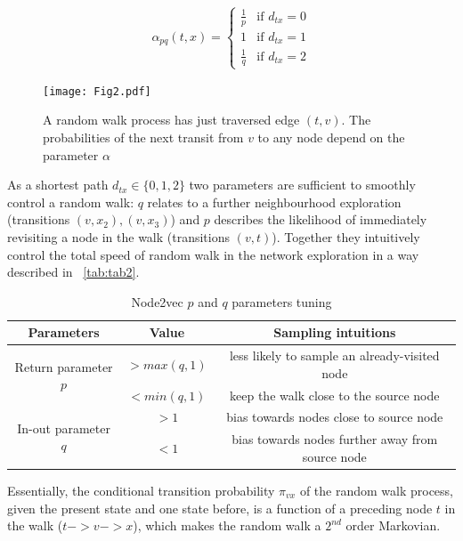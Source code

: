 \begin{equation}
  \alpha_{pq}(t,x) = 
    \begin{cases}
      \frac{1}{p} & \text{if $d_{tx}=0$} \\
      1 & \text{if $d_{tx}=1$} \\
      \frac{1}{q} & \text{if $d_{tx}=2$}
    \end{cases}
    \label{eq:equat2}
\end{equation}
\begin{figure}[!hp]
    \vspace{0pt}
    \centering
    \texttt{[image: Fig2.pdf]}
    \caption{A random walk process has just traversed edge $(t,v)$. The probabilities of the next transit from $v$ to any node depend on the parameter $\alpha$}
    \label{fig:Fig2}
\end{figure}
As a shortest path $d_{tx} \in \{ 0, 1, 2 \} $ two parameters are sufficient to smoothly control a random walk: $q$ relates to a further neighbourhood exploration (transitions $(v, x_2), (v, x_3)$) and $p$ describes the likelihood of immediately revisiting a node in the walk (transitions $(v, t)$). Together they intuitively control the total speed of random walk in the network exploration in a way described in ~\autoref{tab:tab2}.
\begin{table}[!hp]
\begin{center}
\begin{tabular}{|c|c|c|}
    \hline
    Parameters & Value & Sampling intuitions \\
    \hline
    \multirow{2}{*}{Return parameter $p$} & $> max(q,1)$ & less likely to sample an already-visited node \\\cline{2-3}
    & $< min(q, 1)$ & keep the walk close to the source node \\
    \hline
    \multirow{2}{*}{In-out parameter $q$} & $> 1 $ & bias towards nodes close to source node \\\cline{2-3}
    & $< 1$ & bias towards nodes further away from source node \\
    \hline
\end{tabular}
\end{center}
\caption{Node2vec $p$ and $q$ parameters tuning}
\label{tab:tab2}
\end{table}
Essentially, the conditional transition probability $\pi_{vx}$ of the random walk process, given the present state and one state before, is a function of a preceding node $t$ in the walk ($t -> v -> x$), which makes the random walk a $2^{nd}$ order Markovian. 
